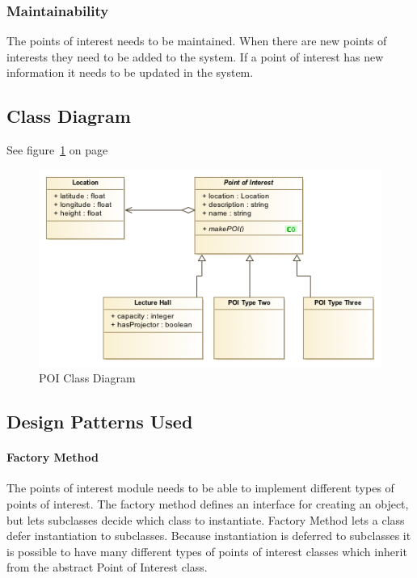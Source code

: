     \subsubsection{Maintainability}
        The points of interest needs to be maintained. When there are new points of interests they need to be added to the system. If a point of interest has new information it needs to be updated in the system.

\subsection{Class Diagram}
See figure~\ref{fig:POI_Class_Diagram} on page~\pageref{fig:POI_Class_Diagram}
\begin{figure}[H]
	\centering
	\includegraphics[scale=0.54]{POI/poi_class_diagram.png}
	\caption{POI Class Diagram}
	\label{fig:POI_Class_Diagram}
\end{figure}

\subsection{Design Patterns Used}
    \paragraph{Factory Method}
    The points of interest module needs to be able to implement different types of points of interest. The factory method defines an interface for creating an object, but lets subclasses decide which class to instantiate. Factory Method lets a class defer instantiation to subclasses. Because instantiation is deferred to subclasses it is possible to have many different types of points of interest classes which inherit from the abstract Point of Interest class.
 
